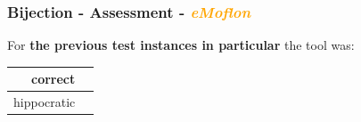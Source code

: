 \documentclass{beamer}
\newcommand{\cmark}{\ding{51}}%
\begin{document}
\begin{frame}
\frametitle{Bijection - \textbf{Assessment} - \textbf{\textit{\textcolor{orange}{eMoflon}}}}

For \textbf{the previous test instances in particular} the tool was:

\begin{center}
\begin{tabular}{| r | c |}
  \hline                        
  correct & \cmark\\
  \hline
  hippocratic & \cmark\\
  \hline 
\end{tabular}
\end{center}

\end{frame}
\end{document}
